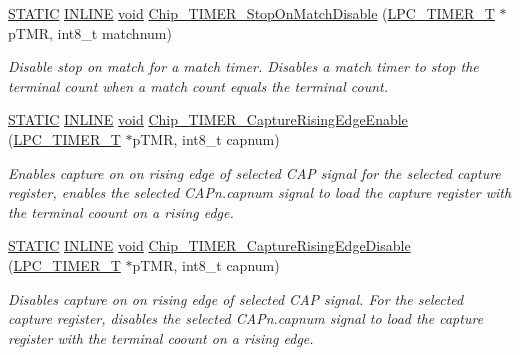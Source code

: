 \begin{DoxyCompactItemize}
\hyperlink{group__LPC__Types__Public__Macros_ga10b2d890d871e1489bb02b7e70d9bdfb}{S\-T\-A\-T\-I\-C} \hyperlink{group__LPC__Types__Public__Types_ga2eb6f9e0395b47b8d5e3eeae4fe0c116}{I\-N\-L\-I\-N\-E} \hyperlink{Paradigm_2Tern__EE_2small_2portmacro_8h_a14d32f8130d3c0b212cfc751730b5b49}{void} \hyperlink{group__TIMER__17XX__40XX_gae1be576a72246ab2255f735245fb49a7}{Chip\-\_\-\-T\-I\-M\-E\-R\-\_\-\-Stop\-On\-Match\-Disable} (\hyperlink{structLPC__TIMER__T}{L\-P\-C\-\_\-\-T\-I\-M\-E\-R\-\_\-\-T} $\ast$p\-T\-M\-R, int8\-\_\-t matchnum)
\begin{DoxyCompactList}\small\item\em Disable stop on match for a match timer. Disables a match timer to stop the terminal count when a match count equals the terminal count. \end{DoxyCompactList}\item 
\hyperlink{group__LPC__Types__Public__Macros_ga10b2d890d871e1489bb02b7e70d9bdfb}{S\-T\-A\-T\-I\-C} \hyperlink{group__LPC__Types__Public__Types_ga2eb6f9e0395b47b8d5e3eeae4fe0c116}{I\-N\-L\-I\-N\-E} \hyperlink{Paradigm_2Tern__EE_2small_2portmacro_8h_a14d32f8130d3c0b212cfc751730b5b49}{void} \hyperlink{group__TIMER__17XX__40XX_ga7768003112560a8cbd06582fa8747fae}{Chip\-\_\-\-T\-I\-M\-E\-R\-\_\-\-Capture\-Rising\-Edge\-Enable} (\hyperlink{structLPC__TIMER__T}{L\-P\-C\-\_\-\-T\-I\-M\-E\-R\-\_\-\-T} $\ast$p\-T\-M\-R, int8\-\_\-t capnum)
\begin{DoxyCompactList}\small\item\em Enables capture on on rising edge of selected C\-A\-P signal for the selected capture register, enables the selected C\-A\-Pn.\-capnum signal to load the capture register with the terminal coount on a rising edge. \end{DoxyCompactList}\item 
\hyperlink{group__LPC__Types__Public__Macros_ga10b2d890d871e1489bb02b7e70d9bdfb}{S\-T\-A\-T\-I\-C} \hyperlink{group__LPC__Types__Public__Types_ga2eb6f9e0395b47b8d5e3eeae4fe0c116}{I\-N\-L\-I\-N\-E} \hyperlink{Paradigm_2Tern__EE_2small_2portmacro_8h_a14d32f8130d3c0b212cfc751730b5b49}{void} \hyperlink{group__TIMER__17XX__40XX_ga25bcfd101f052ee941da5bae28d84fcd}{Chip\-\_\-\-T\-I\-M\-E\-R\-\_\-\-Capture\-Rising\-Edge\-Disable} (\hyperlink{structLPC__TIMER__T}{L\-P\-C\-\_\-\-T\-I\-M\-E\-R\-\_\-\-T} $\ast$p\-T\-M\-R, int8\-\_\-t capnum)
\begin{DoxyCompactList}\small\item\em Disables capture on on rising edge of selected C\-A\-P signal. For the selected capture register, disables the selected C\-A\-Pn.\-capnum signal to load the capture register with the terminal coount on a rising edge. \end{DoxyCompactList}\item 

\end{DoxyCompactItemize}
